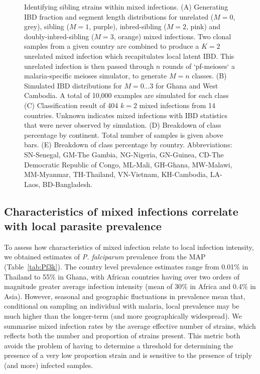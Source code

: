 \documentclass[9pt,lineno]{elife}
\begin{document}
\begin{figure}[htp]
\begin{center}
   \caption{Identifying sibling strains within mixed infections.  (A) Generating IBD fraction and segment length distributions for unrelated ($M=0$, grey), sibling ($M=1$, purple), inbred-sibling ($M=2$, pink) and doubly-inbred-sibling ($M=3$, orange) mixed infections. Two clonal samples from a given country are combined to produce a $K=2$ unrelated mixed infection which recapitulates local latent IBD. This unrelated infection is then passed through $n$ rounds of `pf-meioses` a malaria-specific meioses simulator, to generate $M=n$ classes. (B) Simulated IBD distributions for $M=0...3$ for Ghana and West Cambodia. A total of 10,000 examples are simulated for each class (C) Classification result of 404 $k=2$ mixed infections from 14 countries. Unknown indicates mixed infections with IBD statistics that were never observed by simulation. (D) Breakdown of class percentage by continent. Total number of samples is given above bars. (E) Breakdown of class percentage by country. Abbreviations: SN-Senegal, GM-The Gambia, NG-Nigeria, GN-Guinea, CD-The Democratic Republic of Congo, ML-Mali, GH-Ghana, MW-Malawi, MM-Myanmar, TH-Thailand, VN-Vietnam, KH-Cambodia, LA-Laos, BD-Bangladesh.} \label{fig:classify}
   \end{center}
\end{figure}

\subsection{Characteristics of mixed infections correlate with local parasite prevalence}


To assess how characteristics of mixed infection relate to local infection intensity, we obtained estimates of {\it P. falciparum} prevalence from the MAP (Table~\ref{tab:Pf3k}). The country level prevalence estimates range from 0.01\% in Thailand to 55\% in Ghana, with African countries having over two orders of magnitude greater average infection intensity (mean of 30\% in Africa and 0.4\% in Asia). However, seasonal and geographic fluctuations in prevalence mean that, conditional on sampling an individual with malaria, local prevalence may be much higher than the longer-term (and more geographically widespread). We summarise mixed infection rates by the average effective number of strains, which reflects both the number and proportion of strains present.  This metric both avoids the problem of having to determine a threshold for determining the presence of a very low proportion strain and is sensitive to the presence of triply (and more) infected samples.
\end{document}

